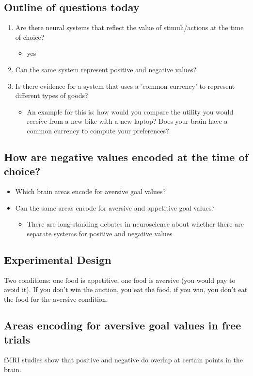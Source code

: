 \subsection{Outline of questions today}
\begin{enumerate}
    \item Are there neural systems that reflect the value of stimuli/actions at the time of choice?
    \begin{itemize}
        \item yes
    \end{itemize}
    \item Can the same system represent positive and negative values?
    \item Is there evidence for a system that uses a 'common currency' to represent different types of goods?
    \begin{itemize}
        \item An example for this is: how would you compare the utility you would receive from a new bike with a new laptop? Does your brain have a common currency to compute your preferences?
    \end{itemize}
\end{enumerate}
\subsection{How are negative values encoded at the time of choice?}
\begin{itemize}
    \item Which brain areas encode for aversive goal values?
    \item Can the same areas encode for aversive and appetitive goal values?
    \begin{itemize}
        \item There are long-standing debates in neuroscience about whether there are separate systems for positive and negative values
    \end{itemize}
\end{itemize}
\subsection{Experimental Design}
Two conditions: one food is appetitive, one food is aversive (you would pay to avoid it).
If you don't win the auction, you eat the food, if you win, you don't eat the food for the aversive condition.
\subsection{Areas encoding for aversive goal values in free trials}
fMRI studies show that positive and negative do overlap at certain points in the brain.

